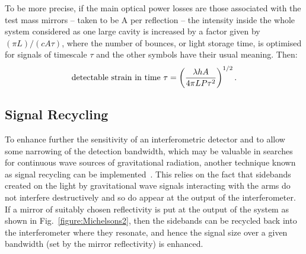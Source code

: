 \documentclass{article}
\begin{document}
To be more precise, if the main optical power losses are those
associated with the test mass mirrors -- taken to be A per reflection --
the intensity inside the whole system considered as one large cavity
is increased by a factor given by $(\pi L)/(c A \tau)$, where the
number of bounces, or light storage time, is optimised for signals of
timescale $\tau$ and the other symbols have their usual meaning. Then:
%
\begin{equation}
  {\rm detectable\ strain\ in\ time\ } \tau = \left( \frac{\lambda h
  A}{4 \pi L P \tau^2} \right)^{1/2}.
  \label{equation:shotpower}
\end{equation}


\subsection{Signal Recycling}
\label{subsection:sigrec}

To enhance further the sensitivity of an interferometric detector and
to allow some narrowing of the detection bandwidth, which may be
valuable in searches for continuous wave sources of gravitational
radiation, another technique known as signal recycling can be
implemented~\cite{Meers, Strain, Heinzel}. This relies on the fact
that sidebands created on the light by gravitational wave signals
interacting with the arms do not interfere destructively and so do
appear at the output of the interferometer. If a mirror of suitably
chosen reflectivity is put at the output of the system as shown in
Fig.~\ref{figure:Michelsons2}, then the sidebands can be recycled back
into the interferometer where they resonate, and hence the signal size
over a given bandwidth (set by the mirror reflectivity) is enhanced.
\end{document}
